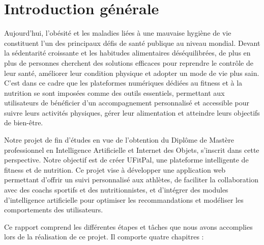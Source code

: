 ﻿\documentclass[a4paper,12pt]{report}
\begin{document}
\sloppy
{}

\tableofcontents
\newpage

\listoftables
{}
\newpage

\listoffigures
{}
\newpage

\setcounter{page}{1}
\chapter*{Introduction générale}

Aujourd'hui, l'obésité et les maladies liées à une mauvaise hygiène de vie constituent l'un des principaux défis de santé publique au niveau mondial. Devant la sédentarité croissante et les habitudes alimentaires déséquilibrées, de plus en plus de personnes cherchent des solutions efficaces pour reprendre le contrôle de leur santé, améliorer leur condition physique et adopter un mode de vie plus sain. C'est dans ce cadre que les plateformes numériques dédiées au fitness et à la nutrition se sont imposées comme des outils essentiels, permettant aux utilisateurs de bénéficier d'un accompagnement personnalisé et accessible pour suivre leurs activités physiques, gérer leur alimentation et atteindre leurs objectifs de bien-être.



Notre projet de fin d'études en vue de l'obtention du Diplôme de Mastère professionnel en Intelligence Artificielle et Internet des Objets, s'inscrit dans cette perspective. Notre objectif est de créer UFitPal, une plateforme intelligente de fitness et de nutrition. Ce projet vise à développer une application web permettant d'offrir un suivi personnalisé aux athlètes, de faciliter la collaboration avec des coachs sportifs et des nutritionnistes, et d'intégrer des modules d'intelligence artificielle pour optimiser les recommandations et
 modéliser les comportements des utilisateurs.

Ce rapport comprend les différentes étapes et tâches que nous avons accomplies lors de la réalisation de ce projet. Il comporte quatre chapitres :
\end{document}

